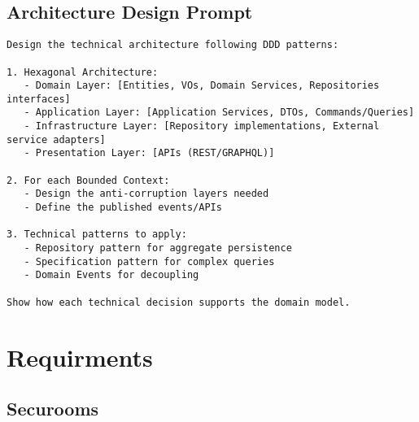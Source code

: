 \subsection{Architecture Design Prompt}\label{app:technical-architecture-prompt}
\begin{Verbatim}[breaklines=true]
Design the technical architecture following DDD patterns:

1. Hexagonal Architecture:
   - Domain Layer: [Entities, VOs, Domain Services, Repositories interfaces]
   - Application Layer: [Application Services, DTOs, Commands/Queries]
   - Infrastructure Layer: [Repository implementations, External service adapters]
   - Presentation Layer: [APIs (REST/GRAPHQL)]

2. For each Bounded Context:
   - Design the anti-corruption layers needed
   - Define the published events/APIs

3. Technical patterns to apply:
   - Repository pattern for aggregate persistence
   - Specification pattern for complex queries
   - Domain Events for decoupling

Show how each technical decision supports the domain model.

\end{Verbatim}

\section{Requirments}

\subsection{Securooms}

